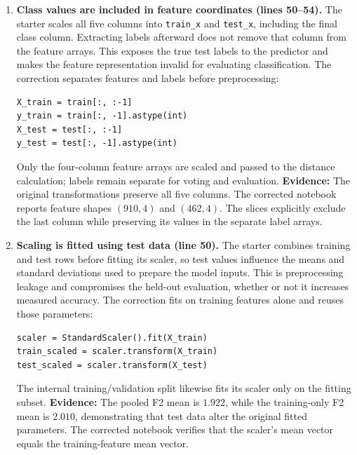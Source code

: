 \documentclass[12pt]{article}
\begin{document}
\begin{enumerate}
\begin{enumerate}[label=\alph*.]
    \item \textbf{Class values are included in feature coordinates (lines 50--54).}
    The starter scales all five columns into \texttt{train\_x} and
    \texttt{test\_x}, including the final class column. Extracting labels
    afterward does not remove that column from the feature arrays. This exposes
    the true test labels to the predictor and makes the feature representation
    invalid for evaluating classification.
    The correction separates features and labels before preprocessing:
\begin{lstlisting}
X_train = train[:, :-1]
y_train = train[:, -1].astype(int)
X_test = test[:, :-1]
y_test = test[:, -1].astype(int)
\end{lstlisting}
    Only the four-column feature arrays are scaled and passed to the distance
    calculation; labels remain separate for voting and evaluation.
    \textbf{Evidence:} The original transformations preserve all five columns.
    The corrected notebook reports feature shapes $(910,4)$ and $(462,4)$.
    The slices explicitly exclude the last column while preserving its values
    in the separate label arrays.

    \item \textbf{Scaling is fitted using test data (line 50).}
    The starter combines training and test rows before fitting its scaler, so test
    values influence the means and standard deviations used to prepare the
    model inputs. This is preprocessing leakage and compromises the held-out
    evaluation, whether or not it increases measured accuracy.
    The correction fits on training features alone and reuses those parameters:
\begin{lstlisting}
scaler = StandardScaler().fit(X_train)
train_scaled = scaler.transform(X_train)
test_scaled = scaler.transform(X_test)
\end{lstlisting}
    The internal training/validation split likewise fits its scaler only on the
    fitting subset.
    \textbf{Evidence:} The pooled F2 mean is $1.922$, while the training-only
    F2 mean is $2.010$, demonstrating that test data alter the original fitted
    parameters. The corrected notebook verifies that the scaler's mean vector
    equals the training-feature mean vector.


\end{enumerate}
\end{enumerate}
\end{document}
